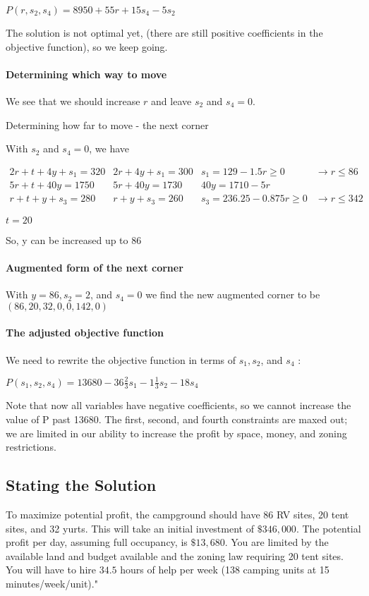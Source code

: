 $P\left(r, s_{2}, s_{4}\right)=8950+55 r+15 s_{4}-5 s_{2}$

The solution is not optimal yet, (there are still positive coefficients in the objective function), so we keep going.

\paragraph{Determining which way to move}
We see that we should increase $r$ and leave $s_{2}$ and $s_{4}=0$.

Determining how far to move - the next corner

With $s_{2}$ and $s_{4}=0$, we have

$\begin{array}{llll}2 r+t+4 y+s_{1}=320 & 2 r+4 y+s_{1}=300 & s_{1}=129-1.5 r \geq 0 & \rightarrow r \leq 86 \\ 5 r+t+40 y=1750 & 5 r+40 y=1730 & 40 y=1710-5 r & \\ r+t+y+s_{3}=280 & r+y+s_{3}=260 & s_{3}=236.25-0.875 r \geq 0 & \rightarrow r \leq 342\end{array}$

$t=20$

So, y can be increased up to 86

\paragraph{Augmented form of the next corner}
With $y=86, s_{2}=2$, and $s_{4}=0$ we find the new augmented corner to be $(86,20,32,0,0,142,0)$

\paragraph{The adjusted objective function}
We need to rewrite the objective function in terms of $s_{1}, s_{2}$, and $s_{4}$ :

$P\left(s_{1}, s_{2}, s_{4}\right)=13680-36 \frac{2}{3} s_{1}-1 \frac{1}{3} s_{2}-18 s_{4}$

Note that now all variables have negative coefficients, so we cannot increase the value of P past 13680. The first, second, and fourth constraints are maxed out; we are limited in our ability to increase the profit by space, money, and zoning restrictions.

\subsection*{ Stating the Solution }
To maximize potential profit, the campground should have 86 RV sites, 20 tent sites, and 32 yurts. This will take an initial investment of $\$ 346,000$. The potential profit per day, assuming full occupancy, is $\$ 13,680$. You are limited by the available land and budget available and the zoning law requiring 20 tent sites. You will have to hire $34.5$ hours of help per week (138 camping units at 15 minutes/week/unit)."

